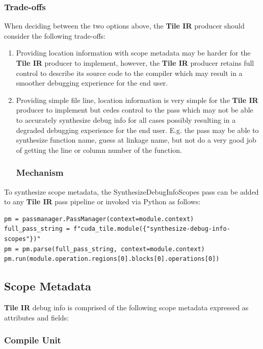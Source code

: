 \documentclass{article}
\begin{document}
\subsubsection{Trade-offs}

When deciding between the two options above, the \textbf{Tile IR} producer should consider the following trade-offs:


\begin{enumerate}
\item Providing location information with scope metadata may be harder for the \textbf{Tile IR} producer to implement, however, the \textbf{Tile IR} producer retains full control to describe its source code to the compiler which may result in a smoother debugging experience for the end user.
\item Providing simple file line, location information is very simple for the \textbf{Tile IR} producer to implement but cedes control to the pass which may not be able to accurately synthesize debug info for all cases possibly resulting in a degraded debugging experience for the end user. E.g. the pass may be able to synthesize function name, guess at linkage name, but not do a very good job of getting the line or column number of the function.


\subsubsection{Mechanism}

\end{enumerate}
To synthesize scope metadata, the SynthesizeDebugInfoScopes pass can be added to any \textbf{Tile IR} pass pipeline or invoked via Python as follows:


\begin{lstlisting}
pm = passmanager.PassManager(context=module.context)
full_pass_string = f"cuda_tile.module({"synthesize-debug-info-scopes"})"
pm = pm.parse(full_pass_string, context=module.context)
pm.run(module.operation.regions[0].blocks[0].operations[0])
\end{lstlisting}


\subsection{Scope Metadata}

\textbf{Tile IR} debug info is comprised of the following scope metadata expressed as attributes and fields:


\subsubsection{Compile Unit}
\end{document}
